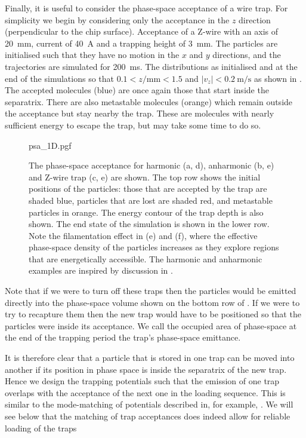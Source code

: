 Finally, it is useful to consider the phase-space acceptance of a wire trap.
For simplicity we begin by considering only the acceptance in the $z$ direction
(perpendicular to the chip surface). Acceptance of a Z-wire with an axis of
\SI{20}{\milli\meter}, current of \SI{40}{\ampere} and a trapping height of
\SI{3}{\milli\meter}. The particles are initialised such that they have no
motion in the $x$ and $y$ directions, and the trajectories are simulated for
\SI{200}{\milli\second}. The distributions as initialised and at the end of the
simulations so that $0.1 < z/\si{\milli\meter} < 1.5$ and
$|v_z|<\SI{0.2}{\meter\per\second}$ as shown in .
The accepted molecules (blue) are once again those that start inside the
separatrix. There are also metastable molecules (orange) which remain outside
the acceptance but stay nearby the trap. These are molecules with nearly
sufficient energy to escape the trap, but may take some time to do so.

\begin{figure}[htb]
  \centering
  {psa_1D.pgf}
  \caption{
    The phase-space acceptance for harmonic (a, d), anharmonic (b, e) and
    Z-wire trap (c, e) are shown. The top row shows the initial positions of
    the particles: those that are accepted by the trap are shaded blue,
    particles that are lost are shaded red, and metastable particles in orange.
    The energy contour of the trap depth is also shown. The end state of the
    simulation is shown in the lower row. Note the filamentation effect in (e)
    and (f), where the effective phase-space density of the particles increases
    as they explore regions that are energetically accessible. The harmonic and
    anharmonic examples are inspired by discussion in
    .
  }
  \label{design:fig:psaeg}
\end{figure}


Note that if we were to turn off these traps then the particles would be
emitted directly into the phase-space volume shown on the bottom row of
. If we were to try to recapture them then the new
trap would have to be positioned so that the particles were inside its
acceptance. We call the occupied area of phase-space at the end of the trapping
period the trap's phase-space emittance.

It is therefore clear that a particle that is stored in one trap can be moved
into another if its position in phase space is inside the separatrix of the new
trap. Hence we design the trapping potentials such that the emission of one
trap overlaps with the acceptance of the next one in the loading sequence. This
is similar to the mode-matching of potentials described in, for example,
. We will see below that the matching of trap acceptances
does indeed allow for reliable loading of the traps

